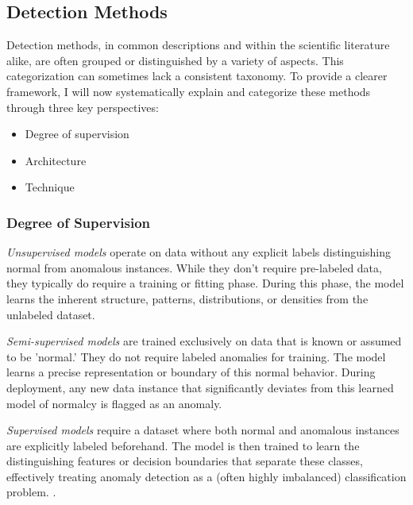 \documentclass[12pt,oneside]{article}
\begin{document}
\subsection{Detection Methods}
Detection methods, in common descriptions and within the scientific literature alike, are often grouped or distinguished by a variety of aspects. This categorization can sometimes lack a consistent taxonomy. To provide a clearer framework, I will now systematically explain and categorize these methods through three key perspectives:
\begin{itemize}
    \item Degree of supervision
    \item Architecture
    \item Technique
\end{itemize}

\subsubsection{Degree of Supervision} \textit{Unsupervised models} operate on data without any explicit labels distinguishing normal from anomalous instances. While they don't require pre-labeled data, they typically do require a training or fitting phase. During this phase, the model learns the inherent structure, patterns, distributions, or densities from the unlabeled dataset.\par \textit{Semi-supervised models} are trained exclusively on data that is known or assumed to be 'normal.' They do not require labeled anomalies for training. The model learns a precise representation or boundary of this normal behavior. During deployment, any new data instance that significantly deviates from this learned model of normalcy is flagged as an anomaly. \par \textit{Supervised models} require a dataset where both normal and anomalous instances are explicitly labeled beforehand. The model is then trained to learn the distinguishing features or decision boundaries that separate these classes, effectively treating anomaly detection as a (often highly imbalanced) classification problem. \parencites[pp.~5-6]{boniol2024divetimeseriesanomalydetection}[p.~3]{liu2024elephant}[p.~3-4]{SchmidlEtAl2022Anomaly}.
\end{document}
